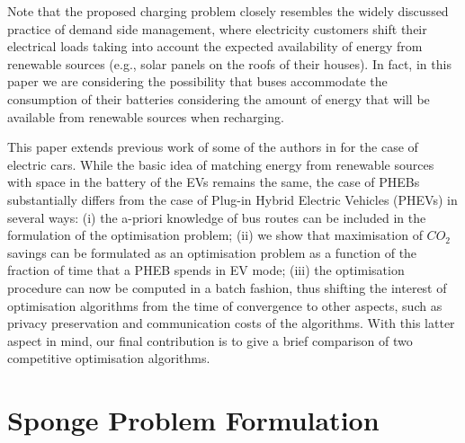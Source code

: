 \documentclass[journal]{IEEEtran}
\begin{document}
Note that the proposed charging problem closely resembles the widely discussed practice of demand side management, where electricity customers shift their electrical loads taking into account the expected availability of energy from renewable sources (e.g., solar panels on the roofs of their houses). In fact, in this paper we are considering the possibility that buses accommodate the consumption of their batteries considering the amount of energy that will be available from renewable sources when recharging.

This paper extends previous work of some of the authors in \cite{Sponge_IJC} for the case of electric cars. While the basic idea of matching energy from renewable sources with space in the battery of the EVs remains the same, the case of PHEBs substantially differs from the case of Plug-in Hybrid Electric Vehicles (PHEVs) in several ways: (i) the a-priori knowledge of bus routes can be included in the formulation of the optimisation problem; (ii) we show that maximisation of $CO_2$ savings can be formulated as an optimisation problem as a function of the fraction of time that a PHEB spends in EV mode; (iii) the optimisation procedure can now be computed in a batch fashion, thus shifting the interest of optimisation algorithms from the time of convergence to other aspects, such as privacy preservation and communication costs of the algorithms. With this latter aspect in mind, our final contribution is to give a brief comparison of two competitive optimisation algorithms.




\section{Sponge Problem Formulation}
\label{Formulation}
\end{document}
